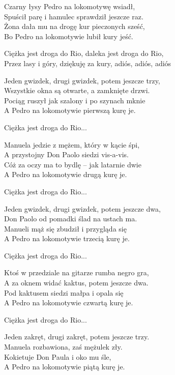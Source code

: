 \begin{text}
    Czarny łysy Pedro na lokomotywę wsiadł,\\
    Spuścił parę i hamulec sprawdził jeszcze raz.\\
    Żona dała mu na drogę kur pieczonych sześć,\\
    Bo Pedro na lokomotywie lubił kury jeść.

    \vin Ciężka jest droga do Rio, daleka jest droga do Rio,\\
    \vin Przez lasy i góry, dziękuję za kury, adiós, adiós, adiós

    Jeden gwizdek, drugi gwizdek, potem jeszcze trzy,\\
    Wszystkie okna są otwarte, a zamknięte drzwi.\\
    Pociąg ruszył jak szalony i po szynach mknie\\
    A Pedro na lokomotywie pierwszą kurę je.

    \vin Ciężka jest droga do Rio...

    Manuela jedzie z mężem, który w kącie śpi,\\
    A przystojny Don Paolo siedzi vis-a-vis.\\
    Cóż za oczy ma to bydlę – jak latarnie dwie\\
    A Pedro na lokomotywie drugą kurę je.

    \vin Ciężka jest droga do Rio...

    Jeden gwizdek, drugi gwizdek, potem jeszcze dwa,\\
    Don Paolo od pomadki ślad na ustach ma.\\
    Manueli mąż się zbudził i przygląda się\\
    A Pedro na lokomotywie trzecią kurę je.

    \vin Ciężka jest droga do Rio...

    Ktoś w przedziale na gitarze rumba negro gra,\\
    A za oknem widać kaktus, potem jeszcze dwa.\\
    Pod kaktusem siedzi małpa i opala się\\
    A Pedro na lokomotywie czwartą kurę je.

    \vin Ciężka jest droga do Rio...

    Jeden zakręt, drugi zakręt, potem jeszcze trzy.\\
    Manuela rozbawiona, zaś mężulek zły.\\
    Kokietuje Don Paula i oko mu śle,\\
    A Pedro na lokomotywie piątą kurę je.


\end{text}
